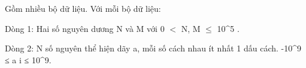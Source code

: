 Gồm nhiều bộ dữ liệu. Với mỗi bộ dữ liệu:

Dòng 1: Hai số nguyên dương N và M với 0 $<$ N, M  $\le$  10^5 .

Dòng 2: N số nguyên thể hiện dãy a, mỗi số cách nhau ít nhất 1 dấu cách. -10^9 ≤ a i ≤ 10^9.